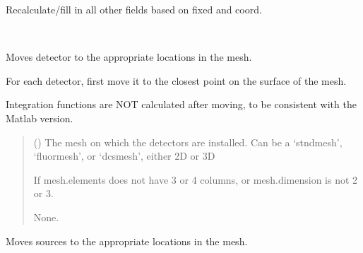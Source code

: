 \documentclass[letterpaper,10pt,english]{sphinxmanual}
\begin{document}
\begin{fulllineitems}
\begin{savenotes}
\begin{longtable}{}
\begin{varwidth}[t]{}
\sphinxAtStartPar
Recalculate/fill in all other fields based on \textquotesingle{}fixed\textquotesingle{} and \textquotesingle{}coord\textquotesingle{}.
\sphinxbeforeendvarwidth
\end{varwidth}%
\\
\sphinxbottomrule
\end{longtable}
\sphinxtableafterendhook
\sphinxatlongtableend
\end{savenotes}

\begin{fulllineitems}
\label{\detokenize{_autosummary/nirfasterff.base.optodes.optode:nirfasterff.base.optodes.optode.move_detectors}}
\pysigstartsignatures
\pysiglinewithargsret
{}
{}
{}
\pysigstopsignatures
\sphinxAtStartPar
Moves detector to the appropriate locations in the mesh.

\sphinxAtStartPar
For each detector, first move it to the closest point on the surface of the mesh.

\sphinxAtStartPar
Integration functions are NOT calculated after moving, to be consistent with the Matlab version.
\begin{quote}\begin{description}
\sphinxAtStartPar
{} () \textendash{} The mesh on which the detectors are installed. Can be a ‘stndmesh’, ‘fluormesh’, or ‘dcsmesh’, either 2D or 3D

\sphinxAtStartPar
{} \textendash{} If mesh.elements does not have 3 or 4 columns, or mesh.dimension is not 2 or 3.

\sphinxAtStartPar
None.

\end{description}\end{quote}

\end{fulllineitems}


\begin{fulllineitems}
\label{\detokenize{_autosummary/nirfasterff.base.optodes.optode:nirfasterff.base.optodes.optode.move_sources}}
\pysigstartsignatures
\pysiglinewithargsret
{}
{}
{}
\pysigstopsignatures
\sphinxAtStartPar
Moves sources to the appropriate locations in the mesh.


\end{fulllineitems}
\end{fulllineitems}
\end{document}

